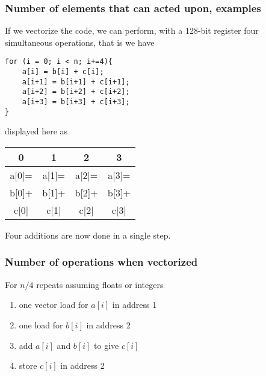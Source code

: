 \documentclass{beamer}
\begin{document}
\begin{frame}
\frametitle{Number of elements that can acted upon, examples}

If we vectorize the code, we can perform, with a 128-bit register four simultaneous operations, that is
we have
\begin{verbatim}
for (i = 0; i < n; i+=4){
    a[i] = b[i] + c[i];
    a[i+1] = b[i+1] + c[i+1];
    a[i+2] = b[i+2] + c[i+2];
    a[i+3] = b[i+3] + c[i+3];
}
\end{verbatim}
displayed here as


{\footnotesize
\begin{tabular}{cccc}
\hline
\multicolumn{1}{c}{ 0 } & \multicolumn{1}{c}{ 1 } & \multicolumn{1}{c}{ 2 } & \multicolumn{1}{c}{ 3 } \\
\hline
a[0]= & a[1]= & a[2]= & a[3]= \\
\hline
b[0]+ & b[1]+ & b[2]+ & b[3]+ \\
\hline
c[0]  & c[1]  & c[2]  & c[3]  \\
\hline
\end{tabular}
}

\noindent
Four additions are now done in a single step.
\end{frame}

\begin{frame}
\frametitle{Number of operations when vectorized}

For $n/4$ repeats assuming floats or integers
\begin{enumerate}
\item one vector load for $a[i]$ in address 1

\item one load for $b[i]$ in address 2

\item add $a[i]$ and $b[i]$ to give $c[i]$

\item store $c[i]$ in address 2
\end{enumerate}

\noindent
\end{frame}
\end{document}
